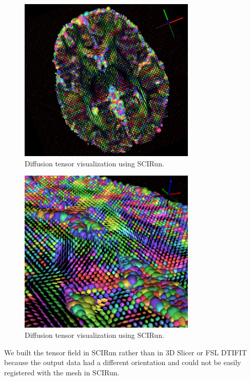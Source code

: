 \begin{figure}[H]
\begin{center}
\includegraphics[width=0.75\textwidth]{Figures/DTI_1.png}
\caption{Diffusion tensor visualization using SCIRun.}
\label{fig:tensorvis}
\end{center}
\end{figure}

\begin{figure}[H]
\begin{center}
\includegraphics[width=0.75\textwidth]{Figures/DTI_2.png}
\caption{Diffusion tensor visualization using SCIRun.}
\label{fig:tensorvis2}
\end{center}
\end{figure}

We built the tensor field in SCIRun rather than in 3D Slicer \cite{ref:slicer} or FSL DTIFIT because the output data had a different orientation and could not be easily registered with the mesh in SCIRun.

